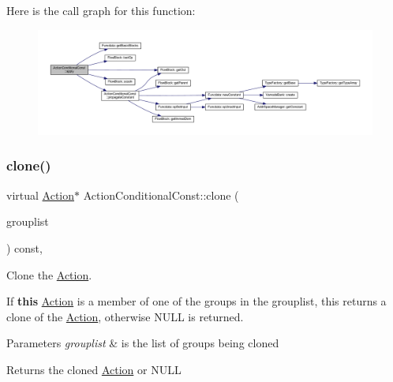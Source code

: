 Here is the call graph for this function\+:
\nopagebreak
\begin{figure}[H]
\begin{center}
\leavevmode
\includegraphics[width=350pt]{class_action_conditional_const_a36547a8bf4913bf94efa661b7f39e461_cgraph}
\end{center}
\end{figure}
\mbox{\label{class_action_conditional_const_a5ff6a3cc3aa54f9a8a276c9e8090010f}} 
\subsubsection{\texorpdfstring{clone()}{clone()}}
{\footnotesize\ttfamily virtual \mbox{\hyperlink{class_action}{Action}}$\ast$ Action\+Conditional\+Const\+::clone (\begin{DoxyParamCaption}\item[{const \mbox{\hyperlink{class_action_group_list}{Action\+Group\+List}} \&}]{grouplist }\end{DoxyParamCaption}) const\hspace{0.3cm}{\ttfamily [inline]}, {\ttfamily [virtual]}}



Clone the \mbox{\hyperlink{class_action}{Action}}. 

If {\bfseries{this}} \mbox{\hyperlink{class_action}{Action}} is a member of one of the groups in the grouplist, this returns a clone of the \mbox{\hyperlink{class_action}{Action}}, otherwise N\+U\+LL is returned. 
\begin{DoxyParams}{Parameters}
{\em grouplist} & is the list of groups being cloned \\
\hline
\end{DoxyParams}
\begin{DoxyReturn}{Returns}
the cloned \mbox{\hyperlink{class_action}{Action}} or N\+U\+LL 
\end{DoxyReturn}



